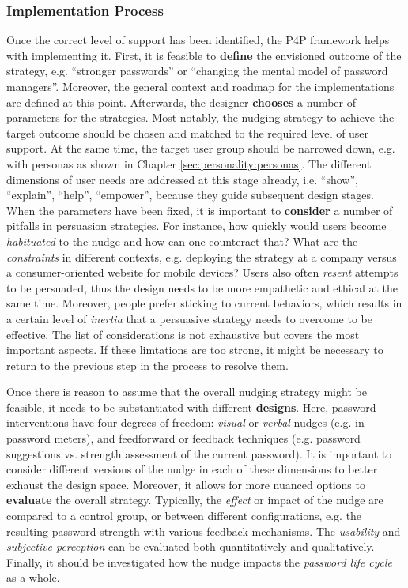\subsubsection{Implementation Process} Once the correct level of support has been identified, the P4P framework helps with implementing it. First, it is feasible to \textbf{define} the envisioned outcome of the strategy, e.g. ``stronger passwords'' or ``changing the mental model of password managers''. Moreover, the general context and roadmap for the implementations are defined at this point. Afterwards, the designer \textbf{chooses} a number of parameters for the strategies. Most notably, the nudging strategy to achieve the target outcome should be chosen and matched to the required level of user support. At the same time, the target user group should be narrowed down, e.g. with \glspl{persona} as shown in Chapter \ref{sec:personality:personas}. The different dimensions of user needs are addressed at this stage already, i.e. ``show'', ``explain'', ``help'', ``empower'', because they guide subsequent design stages. When the parameters have been fixed, it is important to \textbf{consider} a number of pitfalls in persuasion strategies. For instance, how quickly would users become \textit{habituated} to the nudge and how can one counteract that? What are the \textit{constraints} in different contexts, e.g. deploying the strategy at a company versus a consumer-oriented website for mobile devices? Users also often \textit{resent} attempts to be persuaded, thus the design needs to be more empathetic and ethical at the same time. Moreover, people prefer sticking to current behaviors, which results in a certain level of \textit{inertia} that a persuasive strategy needs to overcome to be effective. The list of considerations is not exhaustive but covers the most important aspects. If these limtations are too strong, it might be necessary to return to the previous step in the process to resolve them. 

Once there is reason to assume that the overall nudging strategy might be feasible, it needs to be substantiated with different \textbf{designs}. Here, password interventions have four degrees of freedom: \textit{visual} or \textit{verbal} nudges (e.g. in password meters), and feedforward or feedback techniques (e.g. password suggestions vs. strength assessment of the current password). It is important to consider different versions of the nudge in each of these dimensions to better exhaust the design space. Moreover, it allows for more nuanced options to \textbf{evaluate} the overall strategy. Typically, the \textit{effect} or impact of the nudge are compared to a control group, or between different configurations, e.g. the resulting password strength with various feedback mechanisms. The \textit{usability} and \textit{subjective perception} can be evaluated both quantitatively and qualitatively. Finally, it should be investigated how the nudge impacts the \textit{password life cycle} as a whole. 


